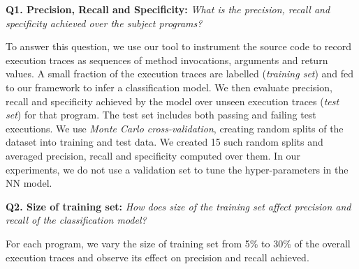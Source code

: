 

\textbf{Q1. Precision, Recall and Specificity:} 
\textit{What is the precision, recall and specificity achieved over the subject programs? }

To answer this question, we use our tool to instrument the source code to 
record execution traces as sequences of method invocations, arguments and return values. 
A small fraction of the  execution traces are labelled (\emph{training set}) and fed to our framework to infer a classification model. We then evaluate precision, recall and specificity achieved by the model over unseen execution traces (\emph{test set}) for that program. The test set includes both passing and failing test executions. We use \emph{Monte Carlo cross-validation}, creating random splits of the dataset into training and test data. We created 15 such random splits and averaged precision, recall and specificity computed over them. In our experiments, we do not use a validation set to tune the hyper-parameters in the NN model.  

\textbf{Q2. Size of training set:}
\textit{How does size of the training set affect precision and recall of the classification model?}

For each program, we vary the size of training set from 5\% to 30\% of the overall execution traces and observe its effect on precision and recall achieved. 

